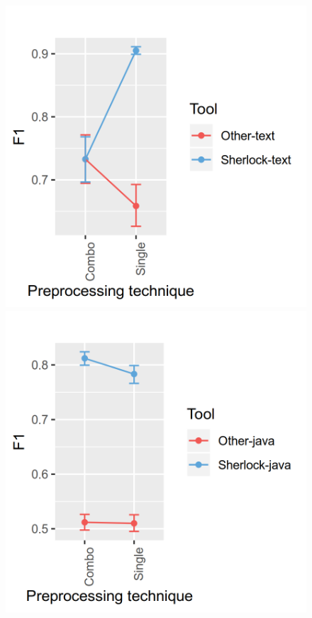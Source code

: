 \documentclass[a4paper, 12pt, oneside, openany, final, pdftex]{book}\usepackage[]{graphicx}\usepackage[]{color}
\makeatletter
\def\maxwidth{ %
  \ifdim\Gin@nat@width>\linewidth
    \linewidth
  \else
    \Gin@nat@width
  \fi
}
\makeatother
\begin{document}
\begin{appendices}
\begin{figure}[ht]
\label{fig:interaction- 6 for SOCO D1 }\endminipage\hfill {} 
\includegraphics[width=\maxwidth]{figure/Figure-SOCO-INTERACTION-7} 
\label{fig:interaction- 7 for SOCO D1 }\endminipage\hfill {} 
\includegraphics[width=\maxwidth]{figure/Figure-SOCO-INTERACTION-8} 

\end{figure}
\end{appendices}
\end{document}
